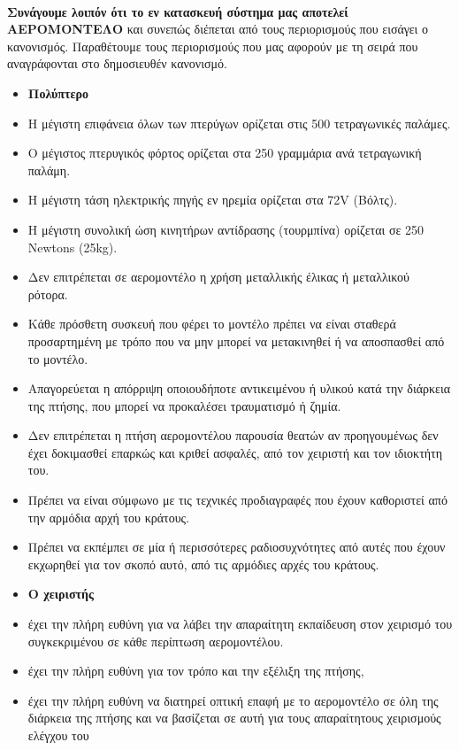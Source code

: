 \documentclass[a4paper, 12pt, twoside]{report}
\begin{document}
{{{{{{			\paragraph{}{\textbf{Συνάγουμε λοιπόν ότι το εν κατασκευή σύστημα μας αποτελεί ΑΕΡΟΜΟΝΤΕΛΟ} και συνεπώς διέπεται από τους περιορισμούς που εισάγει ο κανονισμός. Παραθέτουμε τους περιορισμούς που μας αφορούν με τη σειρά που αναγράφονται στο δημοσιευθέν κανονισμό.
			\begin{itemize}
				\item \textbf{Πολύπτερο}
				\item Η μέγιστη επιφάνεια όλων των πτερύγων ορίζεται
στις 500 τετραγωνικές παλάμες.
				\item Ο μέγιστος πτερυγικός φόρτος ορίζεται στα 250
γραμμάρια ανά τετραγωνική παλάμη.
				\item Η μέγιστη τάση ηλεκτρικής πηγής εν ηρεμία ορίζεται στα 72V (Βόλτς).
				\item Η μέγιστη συνολική ώση κινητήρων αντίδρασης
(τουρμπίνα) ορίζεται σε 250 Newtons (25kg).
				\item Δεν επιτρέπεται σε αερομοντέλο η χρήση μεταλλικής έλικας ή μεταλλικού ρότορα.
				\item Κάθε πρόσθετη συσκευή που φέρει το μοντέλο πρέπει να είναι σταθερά προσαρτημένη με τρόπο που να μην μπορεί να μετακινηθεί ή να αποσπασθεί από το μοντέλο.
				\item Απαγορεύεται η απόρριψη οποιουδήποτε αντικειμένου ή υλικού κατά την διάρκεια της πτήσης, που μπορεί να προκαλέσει τραυματισμό ή ζημία.
				\item Δεν επιτρέπεται η πτήση αερομοντέλου παρουσία θεατών αν προηγουμένως δεν έχει δοκιμασθεί επαρκώς και κριθεί ασφαλές, από τον χειριστή και τον ιδιοκτήτη του.
				\item Πρέπει να είναι σύμφωνο με τις τεχνικές προδιαγραφές
που έχουν καθοριστεί από την αρμόδια αρχή του κράτους.
				\item Πρέπει να εκπέμπει σε μία ή περισσότερες ραδιοσυχνότητες από αυτές που έχουν εκχωρηθεί για τον σκοπό αυτό, από τις αρμόδιες αρχές του κράτους.
				\item \textbf{Ο χειριστής}
				\item έχει την πλήρη ευθύνη για να λάβει την απαραίτητη εκπαίδευση στον χειρισμό του συγκεκριμένου σε κάθε περίπτωση αερομοντέλου.
				\item έχει την πλήρη ευθύνη για τον τρόπο και την εξέλιξη της πτήσης,
				\item έχει την πλήρη ευθύνη να διατηρεί οπτική επαφή με το αερομοντέλο σε όλη της διάρκεια της πτήσης και να βασίζεται σε αυτή για τους απαραίτητους χειρισμούς ελέγχου του

\end{itemize}}}}}}}}
\end{document}
